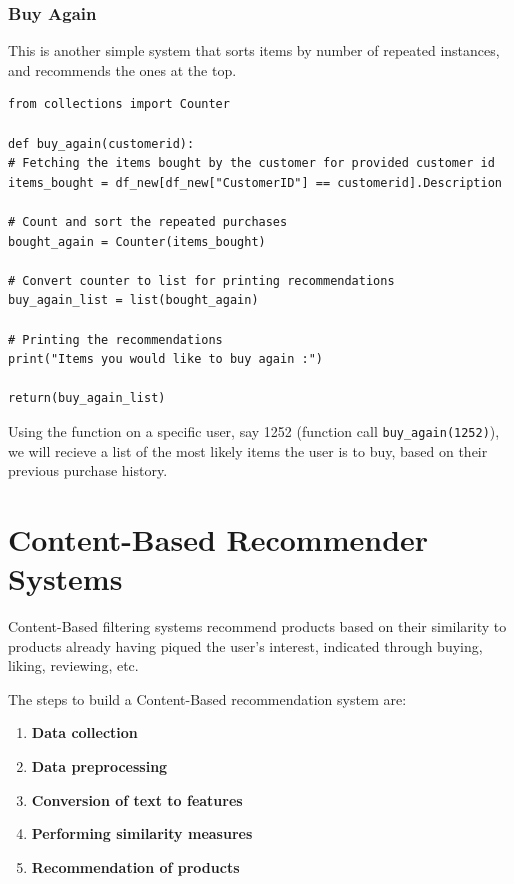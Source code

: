 \documentclass{article}
\begin{document}
\subsubsection{Buy Again}

This is another simple system that sorts items by number of repeated instances, and recommends the ones at the top.

\begin{lstlisting}
from collections import Counter

def buy_again(customerid):
# Fetching the items bought by the customer for provided customer id
items_bought = df_new[df_new["CustomerID"] == customerid].Description

# Count and sort the repeated purchases
bought_again = Counter(items_bought)

# Convert counter to list for printing recommendations
buy_again_list = list(bought_again)

# Printing the recommendations
print("Items you would like to buy again :")

return(buy_again_list)
\end{lstlisting}

Using the function on a specific user, say 1252 (function call \texttt{buy\_again(1252)}), we will recieve a list of the most likely items the user is to buy, based on their previous purchase history.

\section{Content-Based Recommender Systems}

Content-Based filtering systems recommend products based on their similarity to products already having piqued the user's interest, indicated through buying, liking, reviewing, etc.

\medskip

The steps to build a Content-Based recommendation system are:

\begin{enumerate}
    \item{\textbf{Data collection}}
    \item{\textbf{Data preprocessing}}
    \item{\textbf{Conversion of text to features}}
    \item{\textbf{Performing similarity measures}}
    \item{\textbf{Recommendation of products}}
\end{enumerate}
\end{document}
